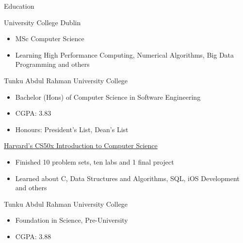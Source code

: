 \documentclass{article}
\newlength{\tabin}
\newlength{\secsep}
\newcommand{\lineunder}{\vspace*{-8pt} \\ \hspace*{-6pt} \hrulefill \\ \vspace*{-15pt}}
\newenvironment{tabbedsection}[1]{
  \begin{list}{}{
      \setlength{\itemsep}{0pt}
      \setlength{\labelsep}{0pt}
      \setlength{\labelwidth}{0pt}
      \setlength{\leftmargin}{\tabin}
      \setlength{\rightmargin}{\tabin}
      \setlength{\listparindent}{0pt}
      \setlength{\parsep}{0pt}
      \setlength{\parskip}{0pt}
      \setlength{\partopsep}{0pt}
      \setlength{\topsep}{#1}
    }
  \item[]
}{\end{list}}
\newenvironment{resume_section}[1]{
  \filbreak
  \vspace{2\secsep}
  \textsc{\large#1}
  \lineunder
  \begin{tabbedsection}{\secsep}
}{\end{tabbedsection}}
\newenvironment{resume_subsection}[2][]{
  \textbf{#2} \hfill {\footnotesize #1} \hspace{2em}
  \begin{tabbedsection}{0.5\secsep}
}{\end{tabbedsection}}
\newenvironment{subitems}{
  \renewcommand{\labelitemi}{-}
  \begin{itemize}
      \setlength{\labelsep}{1em}
}{\end{itemize}}
\begin{document}
\begin{resume_section}{Education}
  \begin{resume_subsection}{University College Dublin}
    \begin{subitems}
      \item MSc Computer Science
      \item Learning High Performance Computing, Numerical Algorithms, Big Data Programming and others
    \end{subitems}
  \end{resume_subsection}

  \begin{resume_subsection}{Tunku Abdul Rahman University College}
    \begin{subitems}
      \item Bachelor (Hons) of Computer Science in Software Engineering
      \item CGPA: 3.83
      \item Honours: President's List, Dean's List
    \end{subitems}
  \end{resume_subsection}

  \begin{resume_subsection}[Online (2020--2021)]{\href{https://drive.google.com/file/d/1-tVq-vD20YwCcI3YgotgKKe_UYvHTwBj/view?usp=sharing}{Harvard's CS50x Introduction to Computer Science}}
    \begin{subitems}
      \item Finished 10 problem sets, ten labs and 1 final project
      \item Learned about C, Data Structures and Algorithms, SQL, iOS Development and others
    \end{subitems}
  \end{resume_subsection}

  \begin{resume_subsection}{Tunku Abdul Rahman University College}
    \begin{subitems}
      \item Foundation in Science, Pre-University
      \item CGPA: 3.88
    \end{subitems}
  \end{resume_subsection}
\end{resume_section}
\end{document}
